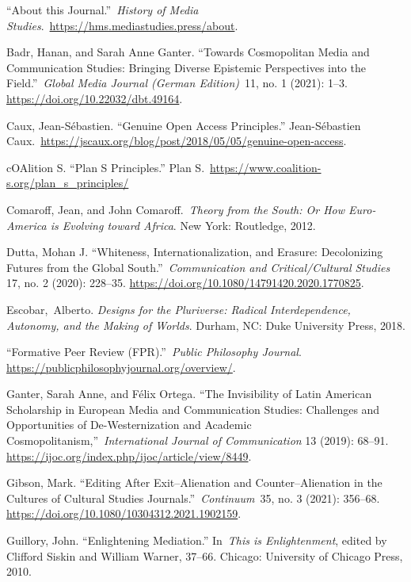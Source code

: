 \documentclass{tufte-handout}
\begin{document}
\begin{hangparas}{.25in}{1} 



``About this Journal.''~\emph{History of Media
Studies}.~\url{https://hms.mediastudies.press/about}.

Badr, Hanan, and Sarah Anne Ganter. ``Towards Cosmopolitan Media and
Communication Studies: Bringing Diverse Epistemic Perspectives into the
Field.''~\emph{Global Media Journal (German Edition)}~11, no. 1 (2021):
1--3. \url{https://doi.org/10.22032/dbt.49164}.

Caux, Jean-Sébastien. ``Genuine Open Access Principles.'' Jean-Sébastien
Caux.~\href{https://jscaux.org/blog/post/2018/05/05/genuine-open-access/}{https://jscaux.org/blog/post/2018/05/05/genuine-open-access}.

cOAlition S. ``Plan S Principles.'' Plan
S.~\url{https://www.coalition-s.org/plan_s_principles/}

Comaroff, Jean, and John Comaroff.~\emph{Theory from the South: Or How
Euro-America is Evolving toward Africa}. New York: Routledge, 2012.


Dutta, Mohan J. ``Whiteness, Internationalization, and Erasure:
Decolonizing Futures from the Global South.''~\emph{Communication and
Critical/Cultural Studies} 17, no. 2 (2020): 228--35.
\url{https://doi.org/10.1080/14791420.2020.1770825}.

Escobar,~Alberto. \emph{Designs for the Pluriverse: Radical
Interdependence, Autonomy, and the Making of Worlds}. Durham, NC: Duke
University Press, 2018.

``Formative Peer Review (FPR).''~\emph{Public Philosophy Journal}.
\url{https://publicphilosophyjournal.org/overview/}.

Ganter, Sarah Anne, and Félix Ortega. ``The Invisibility of Latin
American Scholarship in European Media and Communication Studies:
Challenges and Opportunities of De-Westernization and Academic
Cosmopolitanism,''~\emph{International Journal of Communication} 13
(2019): 68--91. \url{https://ijoc.org/index.php/ijoc/article/view/8449}.

Gibson, Mark. ``Editing After Exit--Alienation and Counter--Alienation
in the Cultures of Cultural Studies Journals.''~\emph{Continuum}~35, no.
3 (2021): 356--68. \url{https://doi.org/10.1080/10304312.2021.1902159}.

Guillory, John. ``Enlightening Mediation.'' In~\emph{This is
Enlightenment}, edited by Clifford Siskin and William Warner, 37--66.
Chicago: University of Chicago Press, 2010.


\end{hangparas}
\end{document}
